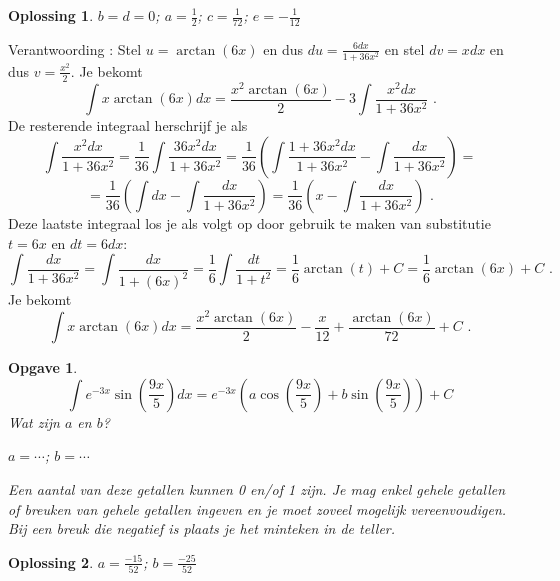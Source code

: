 \documentclass{article}
\newtheorem{opgave}{Opgave}
\newtheorem*{oplossing}{Oplossing}
\begin{document}
\begin{oplossing}
$b=d=0$; $a=\frac{1}{2}$; $c=\frac{1}{72}$; $e=-\frac{1}{12}$
\end{oplossing}

Verantwoording : Stel $u=\arctan (6x)$ en dus $du=\frac{6dx}{1+36x^2}$ en stel $dv=xdx$ en dus $v=\frac{x^2}{2}$.
Je bekomt
\[
\int x \arctan (6x)dx=\frac{x^2 \arctan (6x)}{2}-3\int \frac{x^2dx}{1+36x^2} \text { .}
\]
De resterende integraal herschrijf je als
\[
\int \frac{x^2dx}{1+36x^2}=\frac{1}{36}\int \frac{36x^2dx}{1+36x^2}=\frac{1}{36}\left( \int \frac{1+36x^2dx}{1+36x^2}  -\int \frac{dx}{1+36x^2} \right)=
\]
\[
=\frac{1}{36} \left(  \int dx - \int \frac{dx}{1+36x^2} \right)=\frac{1}{36} \left( x  - \int \frac{dx}{1+36x^2} \right) \text { .}
\]
Deze laatste integraal los je als volgt op door gebruik te maken van substitutie $t=6x$ en $dt=6dx$:
\[
\int \frac{dx}{1+36x^2}=\int \frac{dx}{1+(6x)^2}=\frac{1}{6} \int \frac{dt}{1+t^2}=\frac{1}{6}\arctan (t)+C=\frac{1}{6} \arctan (6x)+C \text { .}
\]
Je bekomt
\[
\int x \arctan (6x)dx=\frac{x^2 \arctan (6x)}{2}-\frac{x}{12}+\frac{\arctan (6x)}{72}+C \text { .}
\]

\begin{opgave}
\[
\int e^{-3x}\sin \left( \frac{9x}{5}  \right)dx=e^{-3x} \left(  a \cos \left( \frac{9x}{5}  \right) +b \sin \left( \frac{9x}{5}  \right) \right)+C
\]
 Wat zijn $a$ en $b$?\vspace{3mm}

\noindent $a= \cdots$; $b=\cdots$\vspace{1mm}

\noindent Een aantal van deze getallen kunnen 0 en/of 1 zijn. Je mag enkel gehele getallen of breuken van gehele getallen ingeven en je moet zoveel mogelijk vereenvoudigen. Bij een breuk die negatief is plaats je het minteken in de teller.
\end{opgave}

\begin{oplossing}
$a=\frac{-15}{52}$; $b=\frac{-25}{52}$
\end{oplossing}
\end{document}
